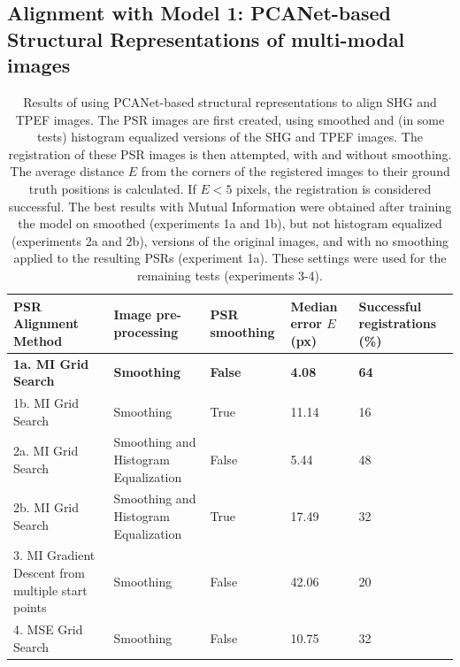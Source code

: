 \documentclass{report}
\begin{document}
\subsection{Alignment with Model 1: PCANet-based Structural Representations of multi-modal images}
\label{sec:evalPSR}
\begin{table}
\centering
\begin{tabular}{|p{1.2in}|p{1.05in}|p{0.75in}|p{0.6in}|p{0.9in}|}
\hline
\textbf{PSR Alignment Method} & \textbf{Image pre-processing} & \textbf{PSR smoothing} & \textbf{Median error $E$ (px)} & \textbf{Successful registrations (\%)} \\
\hline
\hline
\textbf{1a. MI Grid Search} & \textbf{Smoothing} & \textbf{False} & \textbf{4.08} & \textbf{64} \\ %
\hline
1b. MI Grid Search & Smoothing & True & 11.14 & 16 \\ %
\hline
2a. MI Grid Search & Smoothing and Histogram Equalization & False & 5.44 & 48 \\ %
\hline
2b. MI Grid Search & Smoothing and Histogram Equalization & True & 17.49 & 32 \\ %
\hline
3. MI Gradient Descent from multiple start points & Smoothing & False & 42.06 & 20 \\ %
\hline
4. MSE Grid Search & Smoothing & False & 10.75  & 32 \\ %
\hline
\end{tabular}
\caption{Results of using PCANet-based structural representations to align SHG and TPEF images. The PSR images are first created, using smoothed and (in some tests) histogram equalized versions of the SHG and TPEF images. The registration of these PSR images is then attempted, with and without smoothing. The average distance $E$ from the corners of the registered images to their ground truth positions is calculated. If $E<5$ pixels, the registration is considered successful. The best results with Mutual Information were obtained after training the model on smoothed (experiments 1a and 1b), but not histogram equalized (experiments 2a and 2b), versions of the original images, and with no smoothing applied to the resulting PSRs (experiment 1a). These settings were used for the remaining tests (experiments 3-4).}
\label{tab:PSRresults}
\end{table}
\end{document}
